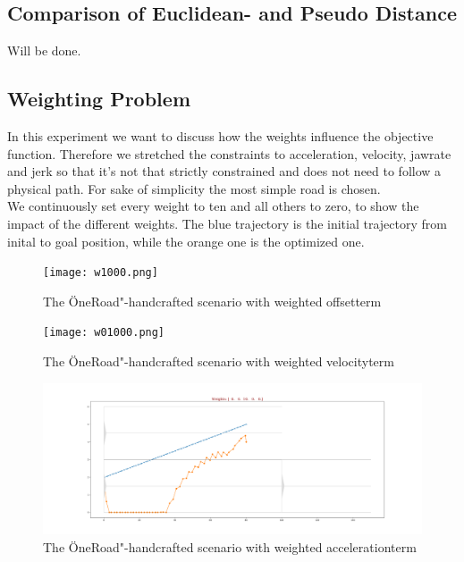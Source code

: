 \documentclass[conference]{IEEEtran}
\begin{document}
\subsection{Comparison of Euclidean- and Pseudo Distance}
Will be done.
\subsection{Weighting Problem}
In this experiment we want to discuss how the weights influence the objective function. Therefore we stretched the constraints to acceleration, velocity, jawrate and jerk so that it's not that strictly constrained and does not need to follow a physical path. For sake of simplicity the most simple road is chosen.\\
We continuously set every weight to ten and all others to zero, to show the impact of the different weights. The blue trajectory is the initial trajectory from inital to goal position, while the orange one is the optimized one.
\begin{figure}[h]
\begin{center}
\texttt{[image: w1000.png]}
\end{center}
\caption{The \"OneRoad"-handcrafted scenario with weighted offsetterm}
\label{offs}
\end{figure}
\begin{figure}[h]
\begin{center}
\texttt{[image: w01000.png]}
\end{center}
\caption{The \"OneRoad"-handcrafted scenario with weighted velocityterm}
\label{ves}
\end{figure}
\begin{figure}[h]
\begin{center}
\includegraphics[scale = 0.6]{w00100.png}
\end{center}
\caption{The \"OneRoad"-handcrafted scenario with weighted accelerationterm}
\label{acc}
\end{figure}\\
\end{document}
